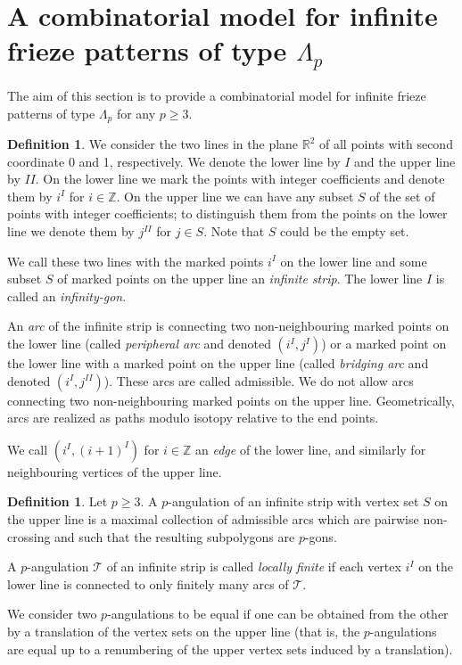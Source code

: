 \documentclass[11pt,a4paper]{amsart}
\theoremstyle{definition}
\newtheorem{Definition}[Lemma]{Definition}
\numberwithin{equation}{section}
\begin{document}
\section{A combinatorial model for infinite frieze patterns of type $\Lambda_p$}
\label{sec:combmodel}

The aim of this section is to provide a combinatorial model for infinite frieze patterns of type $\Lambda_p$
for any $p\ge 3$. 
\smallskip


\begin{Definition}
We consider the two lines in the plane $\mathbb{R}^2$ of all points with second coordinate 0 and 1,
respectively. We denote the lower line by $I$ and the upper line by $II$. 
On the lower line we mark the points with integer coefficients and denote them 
by $i^I$ for $i\in \mathbb{Z}$.  On the upper line we can have any subset $S$ of the set of points with integer
coefficients; to distinguish them from the points on the lower line we denote them by $j^{II}$ for $j\in S$. 
Note that $S$ could be the empty set. 

We call these two lines with the marked points $i^I$ on the lower line and some subset $S$ of marked points 
on the upper line an {\em infinite strip}. 
The lower line $I$ is called an {\em infinity-gon}. 

An {\em arc} of the infinite strip is connecting two non-neighbouring marked points on the lower line 
(called {\em peripheral arc} and denoted $(i^I,j^I)$) or a marked point on the 
lower line with a marked point on the upper line (called {\em bridging arc} and denoted $(i^I,j^{II})$). 
These arcs are called admissible. 
We do not allow arcs connecting two non-neighbouring marked points on the upper line. 
Geometrically, arcs are realized as paths modulo isotopy relative to the end points. 

We call $(i^I,(i+1)^I)$ for $i\in \mathbb{Z}$ an {\em edge} of the lower line, and similarly for 
neighbouring vertices of the upper line. 
\end{Definition}


\begin{Definition}
Let $p\ge 3$. 
A $p$-angulation of an infinite strip with vertex set $S$ on the upper line is a maximal collection of 
admissible arcs which are pairwise non-crossing and such that the resulting subpolygons are $p$-gons.   
\smallskip

A $p$-angulation $\mathcal{T}$ of an infinite strip is called {\em locally finite} if each vertex $i^I$ on the lower line 
is connected to only finitely many arcs of $\mathcal{T}$. 
\smallskip
 
We consider two $p$-angulations to be equal if one can be obtained from the other by a translation of
the vertex sets on the upper line (that is, the $p$-angulations are equal up to a renumbering of the upper 
vertex sets induced by a translation). 
\end{Definition}
\end{document}
